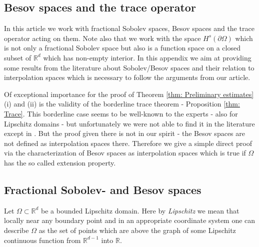 \documentclass{amsart}
\newcommand{\R}{\mathbb{R}}
\begin{document}
\begin{appendix}
\section{Besov spaces and the trace operator}\label{apx: Traces}

In this article we work with fractional Sobolev spaces, Besov spaces and the trace operator acting on them. Note also that we work with the space $H^s(\partial\Omega)$ which is not only a fractional Sobolev space but also is a function space on a closed subset of $\R^d$ which has non-empty interior. In this appendix we aim at providing some results from the literature about Sobolev/Besov spaces and their relation to interpolation spaces which is necessary to follow the arguments from our article.

Of exceptional importance for the proof of Theorem \ref{thm: Preliminary estimates} (i) and (ii) is the validity of the borderline trace theorem - Proposition \ref{thm: Trace}. This borderline case seems to be well-known to the experts - also for Lipschitz domains - but unfortunately we were not able to find it in the literature except in \cite[Theorem 18.6]{Triebel}. But the proof given there is not in our spirit - the Besov spaces are not defined as interpolation spaces there. Therefore we give a simple direct proof via the characterization of Besov spaces as interpolation spaces which is true if $\Omega$ has the so called extension property.

\subsection{Fractional Sobolev- and Besov spaces}\label{apx: fractional Sobolev and Besov spaces}
Let $\Omega\subset\R^d$ be a bounded Lipschitz domain. Here by \emph{Lipschitz} we mean that locally near any boundary point and in an appropriate coordinate system one can describe $\Omega$ as the set of points which are above the graph of some Lipschitz continuous function from $\R^{d-1}$ into $\R$.


\end{appendix}
\end{document}
